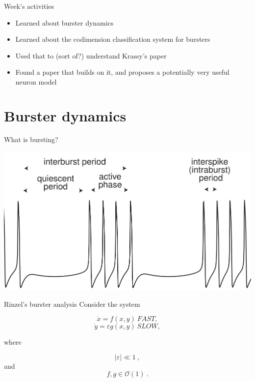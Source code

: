 \documentclass{beamer}
\begin{document}
\begin{frame}[label={sec:org8267f31}]{Week's activities}
\begin{itemize}
\item Learned about burster dynamics
\item Learned about the codimension classification system for bursters
\item Used that to (sort of?) understand Krassy's paper
\item Found a paper that builds on it, and proposes a potentially very useful neuron model
\end{itemize}
\end{frame}


\section{Burster dynamics}
\label{sec:orge2cfe84}
\begin{frame}[label={sec:orgd4e8750}]{What is bursting?}
\begin{center}
\includegraphics[height=.85\textheight]{./burster.png}
\end{center}
\end{frame}

\begin{frame}[label={sec:org648af70}]{Rinzel's burster analysis}
Consider the system

\[ \dot{x} = f(x,y) ~FAST,\]
\[ \dot{y} = \varepsilon g(x,y)~SLOW,\]

where 

\[ |\varepsilon| \ll 1~,\] and \[f,g \in \mathcal{O}(1)~.\]
\end{frame}
\end{document}
